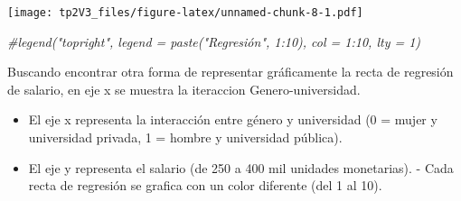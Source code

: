 \documentclass[
]{article}
\newenvironment{Shaded}{\begin{snugshade}}{\end{snugshade}}
\newcommand{\AttributeTok}[1]{\textcolor[rgb]{0.13,0.29,0.53}{#1}}
\newcommand{\CommentTok}[1]{\textcolor[rgb]{0.56,0.35,0.01}{\textit{#1}}}
\newcommand{\ConstantTok}[1]{\textcolor[rgb]{0.56,0.35,0.01}{#1}}
\newcommand{\ControlFlowTok}[1]{\textcolor[rgb]{0.13,0.29,0.53}{\textbf{#1}}}
\newcommand{\DecValTok}[1]{\textcolor[rgb]{0.00,0.00,0.81}{#1}}
\newcommand{\FunctionTok}[1]{\textcolor[rgb]{0.13,0.29,0.53}{\textbf{#1}}}
\newcommand{\NormalTok}[1]{#1}
\newcommand{\OtherTok}[1]{\textcolor[rgb]{0.56,0.35,0.01}{#1}}
\newcommand{\SpecialCharTok}[1]{\textcolor[rgb]{0.81,0.36,0.00}{\textbf{#1}}}
\newcommand{\StringTok}[1]{\textcolor[rgb]{0.31,0.60,0.02}{#1}}
\providecommand{\tightlist}{%
  \setlength{\itemsep}{0pt}\setlength{\parskip}{0pt}}
\begin{document}
\begin{Shaded}
\end{Shaded}

\texttt{[image: tp2V3\_files/figure-latex/unnamed-chunk-8-1.pdf]}

\begin{Shaded}
\begin{Highlighting}[]
\CommentTok{\#legend("topright", legend = paste("Regresión", 1:10), col = 1:10, lty = 1)}
\end{Highlighting}
\end{Shaded}

Buscando encontrar otra forma de representar gráficamente la recta de
regresión de salario, en eje x se muestra la iteraccion
Genero-universidad.

\begin{itemize}
\tightlist
\item
  El eje x representa la interacción entre género y universidad (0 =
  mujer y universidad privada, 1 = hombre y universidad pública).
\item
  El eje y representa el salario (de 250 a 400 mil unidades monetarias).
  - Cada recta de regresión se grafica con un color diferente (del 1 al
  10).
\end{itemize}
\end{document}
